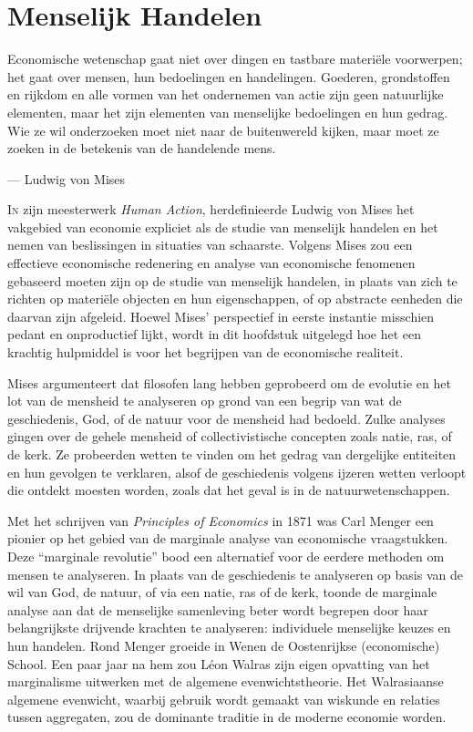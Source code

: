 \chapter{Menselijk Handelen}

\begin{blockquotebox}
    Economische wetenschap gaat niet over dingen en tastbare materiële voorwerpen; het gaat over mensen, hun bedoelingen en handelingen. Goederen, grondstoffen en rijkdom en alle vormen van het ondernemen van actie zijn geen natuurlijke elementen, maar het zijn elementen van menselijke bedoelingen en hun gedrag. Wie ze wil onderzoeken moet niet naar de buitenwereld kijken, maar moet ze zoeken in de betekenis van de handelende mens.\footnotemark \par\raggedleft--- Ludwig von Mises
\end{blockquotebox}
\autocite{1}

\noindent \lettrine{I}n zijn meesterwerk \textit{Human Action}, herdefinieerde Ludwig von Mises het vakgebied van economie expliciet als de studie van menselijk handelen en het nemen van beslissingen in situaties van schaarste. Volgens Mises zou een effectieve economische redenering en analyse van economische fenomenen gebaseerd moeten zijn op de studie van menselijk handelen, in plaats van zich te richten op materiële objecten en hun eigenschappen, of op abstracte eenheden die daarvan zijn afgeleid. Hoewel Mises' perspectief in eerste instantie misschien pedant en onproductief lijkt, wordt in dit hoofdstuk uitgelegd hoe het een krachtig hulpmiddel is voor het begrijpen van de economische realiteit.

Mises argumenteert dat filosofen lang hebben geprobeerd om de evolutie en het lot van de mensheid te analyseren op grond van een begrip van wat de geschiedenis, God, of de natuur voor de mensheid had bedoeld. Zulke analyses gingen over de gehele mensheid of collectivistische concepten zoals natie, ras, of de kerk. Ze probeerden wetten te vinden om het gedrag van dergelijke entiteiten en hun gevolgen te verklaren, alsof de geschiedenis volgens ijzeren wetten verloopt die ontdekt moesten worden, zoals dat het geval is in de natuurwetenschappen.

Met het schrijven van \textit{Principles of Economics} in 1871 was Carl Menger een pionier op het gebied van de marginale analyse van economische vraagstukken. Deze “marginale revolutie” bood een alternatief voor de eerdere methoden om mensen te analyseren. In plaats van de geschiedenis te analyseren op basis van de wil van God, de natuur, of via een natie, ras of de kerk, toonde de marginale analyse aan dat de menselijke samenleving beter wordt begrepen door haar belangrijkste drijvende krachten te analyseren: individuele menselijke keuzes en hun handelen. Rond Menger groeide in Wenen de Oostenrijkse (economische) School. Een paar jaar na hem zou Léon Walras zijn eigen opvatting van het marginalisme uitwerken met de algemene evenwichtstheorie. Het Walrasiaanse algemene evenwicht, waarbij gebruik wordt gemaakt van wiskunde en relaties tussen aggregaten, zou de dominante traditie in de moderne economie worden.

